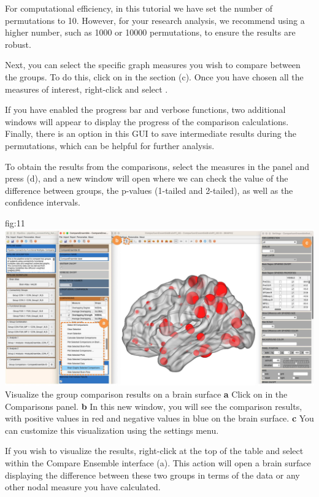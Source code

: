 \documentclass[justified]{tufte-handout}
\begin{document}
For computational efficiency, in this tutorial we have set the number of permutations to 10. However, for your research analysis, we recommend using a higher number, such as 1000 or 10000 permutations, to ensure the results are robust.

Next, you can select the specific graph measures you wish to compare between the groups. To do this, click on  in the  section (c). Once you have chosen all the measures of interest, right-click and select .

If you have enabled the progress bar and verbose functions, two additional windows will appear to display the progress of the comparison calculations. Finally, there is an option in this GUI to save intermediate results during the permutations, which can be helpful for further analysis.
 
To obtain the results from the comparisons, select the measures in the  panel and press  ({d}), and a new window will open where we can check the value of the difference between groups, the p-values (1-tailed and 2-tailed), as well as the confidence intervals.

	{fig:11}
	{
	\includegraphics{fig11.jpg}
	}
	{Visualize the group comparison results on a brain surface}
	{
	{\bf a} Click on  in the Comparisons panel.
	{\bf b} In this new window, you will see the comparison results, with positive values in red and negative values in blue on the brain surface.
{\bf c} You can customize this visualization using the settings menu.
	}

If you wish to visualize the results, right-click at the top of the table and select  within the Compare Ensemble interface (a). This action will open a brain surface displaying the difference between these two groups in terms of the  data or any other nodal measure you have calculated.
\end{document}
